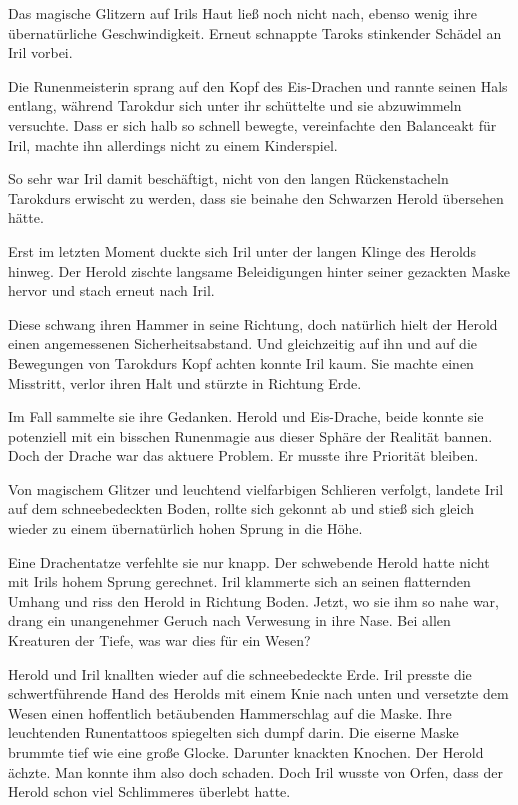 Das magische Glitzern auf Irils Haut ließ noch nicht nach, ebenso wenig ihre übernatürliche Geschwindigkeit. Erneut schnappte Taroks stinkender Schädel an Iril vorbei.

Die Runenmeisterin sprang auf den Kopf des Eis-Drachen und rannte seinen Hals entlang, während Tarokdur sich unter ihr schüttelte und sie abzuwimmeln versuchte. Dass er sich halb so schnell bewegte, vereinfachte den Balanceakt für Iril, machte ihn allerdings nicht zu einem Kinderspiel.

So sehr war Iril damit beschäftigt, nicht von den langen Rückenstacheln Tarokdurs erwischt zu werden, dass sie beinahe den Schwarzen Herold übersehen hätte.

Erst im letzten Moment duckte sich Iril unter der langen Klinge des Herolds hinweg. Der Herold zischte langsame Beleidigungen hinter seiner gezackten Maske hervor und stach erneut nach Iril.

Diese schwang ihren Hammer in seine Richtung, doch natürlich hielt der Herold einen angemessenen Sicherheitsabstand. Und gleichzeitig auf ihn und auf die Bewegungen von Tarokdurs Kopf achten konnte Iril kaum. Sie machte einen Misstritt, verlor ihren Halt und stürzte in Richtung Erde.

Im Fall sammelte sie ihre Gedanken. Herold und Eis-Drache, beide konnte sie potenziell mit ein bisschen Runenmagie aus dieser Sphäre der Realität bannen. Doch der Drache war das aktuere Problem. Er musste ihre Priorität bleiben.

Von magischem Glitzer und leuchtend vielfarbigen Schlieren verfolgt, landete Iril auf dem schneebedeckten Boden, rollte sich gekonnt ab und stieß sich gleich wieder zu einem übernatürlich hohen Sprung in die Höhe.

Eine Drachentatze verfehlte sie nur knapp. Der schwebende Herold hatte nicht mit Irils hohem Sprung gerechnet. Iril klammerte sich an seinen flatternden Umhang und riss den Herold in Richtung Boden. Jetzt, wo sie ihm so nahe war, drang ein unangenehmer Geruch nach Verwesung in ihre Nase. Bei allen Kreaturen der Tiefe, was war dies für ein Wesen?

Herold und Iril knallten wieder auf die schneebedeckte Erde. Iril presste die schwertführende Hand des Herolds mit einem Knie nach unten und versetzte dem Wesen einen hoffentlich betäubenden Hammerschlag auf die Maske. Ihre leuchtenden Runentattoos spiegelten sich dumpf darin. Die eiserne Maske brummte tief wie eine große Glocke. Darunter knackten Knochen. Der Herold ächzte. Man konnte ihm also doch schaden. Doch Iril wusste von Orfen, dass der Herold schon viel Schlimmeres überlebt hatte.

